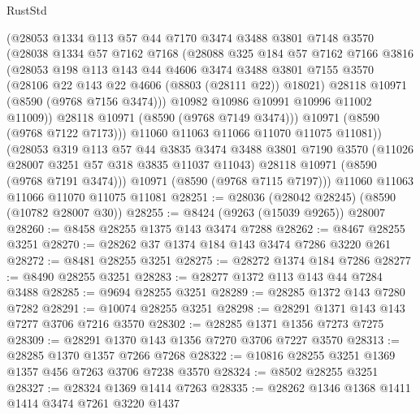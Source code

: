 \begin{lexlean}{RustStd}
\begin{coremodule}
            (@28053
              @1334
              @113
              @57
              @44
              @7170
              @3474
              @3488
              @3801
              @7148
              @3570
              (@28038
                @1334
                @57
                @7162
                @7168
                (@28088
                  @325
                  @184
                  @57
                  @7162
                  @7166
                  @3816
                  (@28053
                    @198
                    @113
                    @143
                    @44
                    @4606
                    @3474
                    @3488
                    @3801
                    @7155
                    @3570
                    (@28106 @22 @143 @22 @4606 (@8803 (@28111 @22)) @18021)
                    @28118
                    @10971
                    (@8590 (@9768 @7156 @3474)))
                  @10982
                  @10986
                  @10991
                  @10996
                  @11002
                  @11009))
              @28118
              @10971
              (@8590 (@9768 @7149 @3474)))
            @10971
            (@8590 (@9768 @7122 @7173)))
          @11060
          @11063
          @11066
          @11070
          @11075
          @11081))
      (@28053
        @319
        @113
        @57
        @44
        @3835
        @3474
        @3488
        @3801
        @7190
        @3570
        (@11026 @28007 @3251 @57 @318 @3835 @11037 @11043)
        @28118
        @10971
        (@8590 (@9768 @7191 @3474)))
      @10971
      (@8590 (@9768 @7115 @7197)))
    @11060
    @11063
    @11066
    @11070
    @11075
    @11081
@28251 := @28036 (@28042 @28245) (@8590 (@10782 @28007 @30))
@28255 := @8424 (@9263 (@15039 @9265)) @28007
@28260 := @8458 @28255 @1375 @143 @3474 @7288
@28262 := @8467 @28255 @3251
@28270 := @28262 @37 @1374 @184 @143 @3474 @7286 @3220 @261
@28272 := @8481 @28255 @3251
@28275 := @28272 @1374 @184 @7286
@28277 := @8490 @28255 @3251
@28283 := @28277 @1372 @113 @143 @44 @7284 @3488
@28285 := @9694 @28255 @3251
@28289 := @28285 @1372 @143 @7280 @7282
@28291 := @10074 @28255 @3251
@28298 := @28291 @1371 @143 @143 @7277 @3706 @7216 @3570
@28302 := @28285 @1371 @1356 @7273 @7275
@28309 := @28291 @1370 @143 @1356 @7270 @3706 @7227 @3570
@28313 := @28285 @1370 @1357 @7266 @7268
@28322 := @10816 @28255 @3251 @1369 @1357 @456 @7263 @3706 @7238 @3570
@28324 := @8502 @28255 @3251
@28327 := @28324 @1369 @1414 @7263
@28335 := @28262 @1346 @1368 @1411 @1414 @3474 @7261 @3220 @1437

\end{coremodule}
\end{lexlean}
